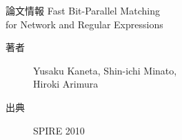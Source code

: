 \documentclass[dvipdfmx,12pt,beamer]{standalone}
\begin{document}
\begin{frame}{論文情報}
	Fast Bit-Parallel Matching \\ for Network and Regular Expressions
	\begin{description}
		\item[著者] Yusaku Kaneta, Shin-ichi Minato, \\ Hiroki Arimura
		\item[出典] SPIRE 2010
	\end{description}
\end{frame}
\end{document}
